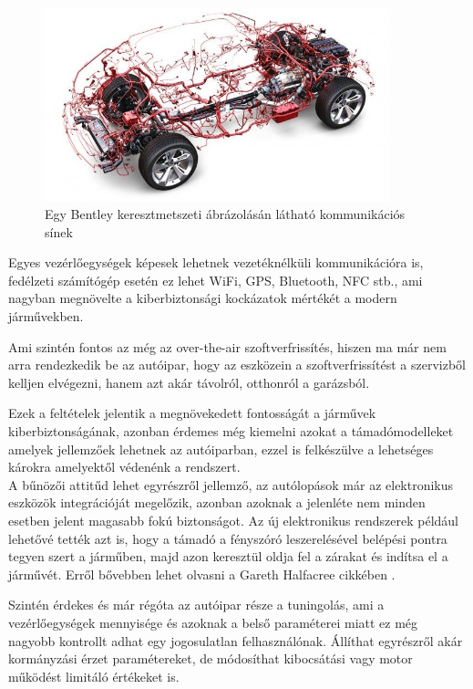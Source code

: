 \begin{figure}[!ht]
	\centering
	\includegraphics[width=100mm, keepaspectratio]{figures/bentley.jpg}
	\caption{Egy Bentley keresztmetszeti ábrázolásán látható kommunikációs sínek\cite{bentley}}
	\label{fig:bentley}
\end{figure}

Egyes vezérlőegységek képesek lehetnek vezetéknélküli kommunikációra is, fedélzeti számítógép esetén ez lehet WiFi, GPS, Bluetooth, NFC stb., ami nagyban megnövelte a kiberbiztonsági kockázatok mértékét a modern járművekben. 

Ami szintén fontos az még az over-the-air szoftverfrissítés, hiszen ma már nem arra rendezkedik be az autóipar, hogy az eszközein a szoftverfrissítést a szervizből kelljen elvégezni, hanem azt akár távolról, otthonról a garázsból.

Ezek a feltételek jelentik a megnövekedett fontosságát a járművek kiberbiztonságának, azonban érdemes még kiemelni azokat a támadómodelleket amelyek jellemzőek lehetnek az autóiparban, ezzel is felkészülve a lehetséges károkra amelyektől védenénk a rendszert.\\

A bűnözői attitűd lehet egyrészről jellemző, az autólopások már az elektronikus eszközök integrációját megelőzik, azonban azoknak a jelenléte nem minden esetben jelent magasabb fokú biztonságot. Az új elektronikus rendszerek például lehetővé tették azt is, hogy a támadó a fényszóró leszerelésével belépési pontra tegyen szert a járműben, majd azon keresztül oldja fel a zárakat és indítsa el a járművét. Erről bővebben lehet olvasni a Gareth Halfacree cikkében \cite{toyota}.

Szintén érdekes és már régóta az autóipar része a tuningolás, ami a vezérlőegységek mennyisége és azoknak a belső paraméterei miatt ez még nagyobb kontrollt adhat egy jogosulatlan felhasználónak. Állíthat egyrészről akár kormányzási érzet paramétereket, de módosíthat kibocsátási vagy motor működést limitáló értékeket is.

